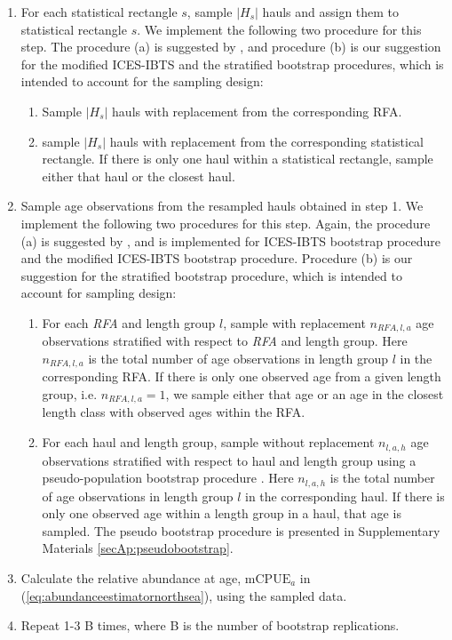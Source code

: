 \documentclass[a4paper 12pt]{article}
\numberwithin{equation}{section}
\begin{document}
\begin{enumerate}
\item For each statistical rectangle $s$, sample $|H_s|$ hauls and assign them to statistical rectangle $s$. We implement the following two procedure for this step. The procedure (a) is suggested by \citep{ICES2006Report}, and procedure (b) is our suggestion for the modified ICES-IBTS and the stratified  bootstrap procedures, which is intended to account for the sampling design: 
\begin{enumerate}
\item Sample $|H_s|$ hauls with replacement from the corresponding RFA.
\item sample $|H_s|$ hauls with replacement from the corresponding statistical rectangle. If there is only one haul within a statistical rectangle, sample either that haul or the closest haul.
\end{enumerate}
\item Sample age observations from the resampled hauls obtained in step 1. We implement the following two procedures for this step. Again, the procedure (a) is suggested by \citep{ICES2006Report}, and is implemented for ICES-IBTS bootstrap procedure and the modified ICES-IBTS bootstrap procedure. Procedure (b) is our suggestion for the stratified bootstrap procedure, which is intended to account for sampling design: 
\begin{enumerate}
\item For each \textit{RFA} and length group $l$, sample with replacement $n_{RFA,l,a}$ age observations stratified with respect to \textit{RFA} and length group. Here $n_{RFA,l,a}$ is the total number of age observations in length group $l$ in the corresponding RFA. If there is only one observed age from a given length group, i.e. $n_{RFA,l,a} = 1$, we sample either that age or an age in the closest length class with observed ages within the RFA.
\item For each haul and length group, sample without replacement  $n_{l,a,h}$ age observations stratified with respect to haul and length group using a pseudo-population bootstrap procedure \citep{mashreghi2016survey}. Here $n_{l,a,h}$ is the total number of age observations in length group $l$ in the corresponding haul. If there is only one observed age within a length group in a haul, that age is sampled. The pseudo bootstrap procedure is presented in Supplementary Materials \ref{secAp:pseudobootstrap}. 

\end{enumerate}
\item Calculate the relative abundance at age, $\text{mCPUE}_a$ in (\ref{eq:abundanceestimatornorthsea}), using the sampled data.
\item Repeat 1-3 B times, where B is the number of bootstrap replications.
\end{enumerate}
\end{document}
